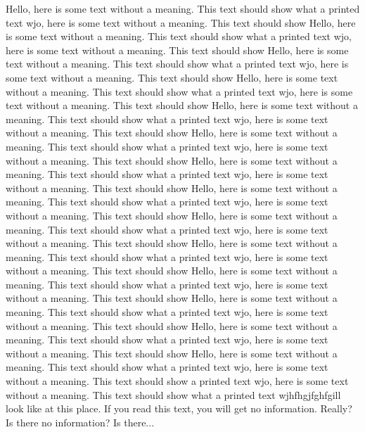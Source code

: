 \documentclass{article}
\begin{document}
\begin{multicols}{3}
Hello, here is some text without a meaning.  This text should show what 
a printed text wjo, here is some text without a meaning.  This text should show 
Hello, here is some text without a meaning.  This text should show what 
a printed text wjo, here is some text without a meaning.  This text should show 
Hello, here is some text without a meaning.  This text should show what 
a printed text wjo, here is some text without a meaning.  This text should show 
Hello, here is some text without a meaning.  This text should show what 
a printed text wjo, here is some text without a meaning.  This text should show 
Hello, here is some text without a meaning.  This text should show what 
a printed text wjo, here is some text without a meaning.  This text should show 
Hello, here is some text without a meaning.  This text should show what 
a printed text wjo, here is some text without a meaning.  This text should show 
Hello, here is some text without a meaning.  This text should show what 
a printed text wjo, here is some text without a meaning.  This text should show 
Hello, here is some text without a meaning.  This text should show what 
a printed text wjo, here is some text without a meaning.  This text should show 
Hello, here is some text without a meaning.  This text should show what 
a printed text wjo, here is some text without a meaning.  This text should show 
Hello, here is some text without a meaning.  This text should show what 
a printed text wjo, here is some text without a meaning.  This text should show 
Hello, here is some text without a meaning.  This text should show what 
a printed text wjo, here is some text without a meaning.  This text should show 
Hello, here is some text without a meaning.  This text should show what 
a printed text wjo, here is some text without a meaning.  This text should show 
Hello, here is some text without a meaning.  This text should show what 
a printed text wjo, here is some text without a meaning.  This text should show 
Hello, here is some text without a meaning.  This text should show what 
a printed text wjo, here is some text without a meaning.  This text should show 
a printed text wjo, here is some text without a meaning.  This text should show what 
a printed text wjhfhgjfghfgill look like at this place.
If you read this text, you will get no information.  Really?  Is there 
no information?  Is there...
\end{multicols}
 
\end{document}
